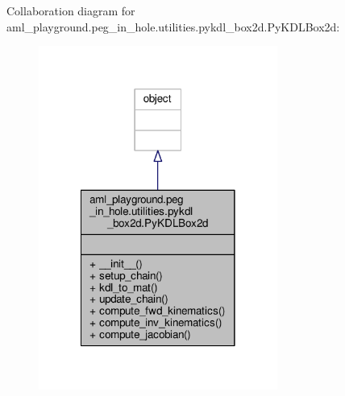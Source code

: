 Collaboration diagram for aml\-\_\-playground.\-peg\-\_\-in\-\_\-hole.\-utilities.\-pykdl\-\_\-box2d.\-Py\-K\-D\-L\-Box2d\-:\nopagebreak
\begin{figure}[H]
\begin{center}
\leavevmode
\includegraphics[width=222pt]{classaml__playground_1_1peg__in__hole_1_1utilities_1_1pykdl__box2d_1_1_py_k_d_l_box2d__coll__graph}
\end{center}
\end{figure}
